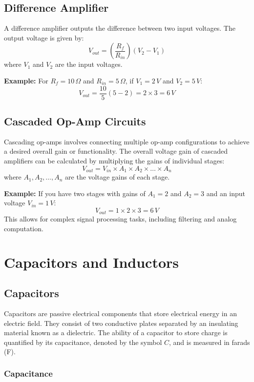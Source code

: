 \documentclass[openany]{book}
\begin{document}
\section{Difference Amplifier}
A difference amplifier outputs the difference between two input voltages. The output voltage is given by:
\[
V_{out} = \left(\frac{R_f}{R_{in}}\right) (V_2 - V_1)
\]
where \(V_1\) and \(V_2\) are the input voltages.

\textbf{Example:} For \(R_f = 10 \, \Omega\) and \(R_{in} = 5 \, \Omega\), if \(V_1 = 2 \, V\) and \(V_2 = 5 \, V\):
\[
V_{out} = \frac{10}{5} (5 - 2) = 2 \times 3 = 6 \, V
\]

\section{Cascaded Op-Amp Circuits}
Cascading op-amps involves connecting multiple op-amp configurations to achieve a desired overall gain or functionality. The overall voltage gain of cascaded amplifiers can be calculated by multiplying the gains of individual stages:
\[
V_{out} = V_{in} \times A_1 \times A_2 \times \ldots \times A_n
\]
where \(A_1, A_2, \ldots, A_n\) are the voltage gains of each stage.

\textbf{Example:} If you have two stages with gains of \(A_1 = 2\) and \(A_2 = 3\) and an input voltage \(V_{in} = 1 \, V\):
\[
V_{out} = 1 \times 2 \times 3 = 6 \, V
\]
This allows for complex signal processing tasks, including filtering and analog computation.

\chapter{Capacitors and Inductors}

\section{Capacitors}

Capacitors are passive electrical components that store electrical energy in an electric field. They consist of two conductive plates separated by an insulating material known as a dielectric. The ability of a capacitor to store charge is quantified by its capacitance, denoted by the symbol \(C\), and is measured in farads (F).

\subsection{Capacitance}
\end{document}
